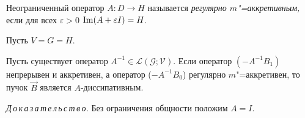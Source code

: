 \smallskip

\begin{definition}[3.2]Неограниченный оператор $A:D\rightarrow H$ называется \emph{регулярно \mbox{$m$"=аккретивным,}} если для всех $\varepsilon>0$ $\mathop{\rm Im}(A+\varepsilon I)=H$.
\end{definition}

\smallskip

Пусть $V=G=H.$

\smallskip

\begin{remark}[3.1] Пусть существует оператор $A^{-1}\in \mathcal L (\mathcal G;\mathcal V).$ Если оператор $(-A^{-1}B_{1})$
непрерывен и аккретивен, а оператор ($-A^{-1}B_{0}$) регулярно $m$"=аккретивен, то пучок $\vec{B}$ является \mbox{$A$-диссипативным.}
\end{remark}

\textit{Д\,о\,к\,а\,з\,а\,т\,е\,л\,ь\,с\,т\,в\,о.} Без ограничения общности положим $A=I$.

